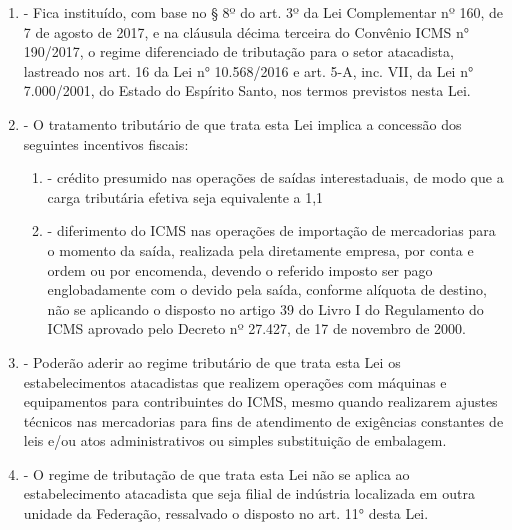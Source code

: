\documentclass[10pt]{article}
\begin{document}
\begin{enumerate}[label=Art. \arabic*\textdegree]

\item - Fica instituído, com base no § 8º do art. 3º da Lei Complementar nº 160, de 7 de agosto de 2017, e na cláusula décima terceira do Convênio ICMS n° 190/2017, o regime diferenciado de tributação para o setor atacadista, lastreado nos art. 16 da Lei n° 10.568/2016 e art. 5-A, inc. VII, da Lei n° 7.000/2001, do Estado do Espírito Santo, nos termos previstos nesta Lei.

\item - O tratamento tributário de que trata esta Lei implica a concessão dos seguintes incentivos fiscais:
\begin{enumerate}[label=\Roman*]
\item - crédito presumido nas operações de saídas interestaduais, de modo que a carga tributária efetiva seja equivalente a 1,1 %
\item - diferimento do ICMS nas operações de importação de mercadorias para o momento da saída, realizada pela diretamente empresa, por conta e ordem ou por encomenda, devendo o referido imposto ser pago englobadamente com o devido pela saída, conforme alíquota de destino, não se aplicando o disposto no artigo 39 do Livro I do Regulamento do ICMS aprovado pelo Decreto nº 27.427, de 17 de novembro de 2000.
\end{enumerate}

\item - Poderão aderir ao regime tributário de que trata esta Lei os estabelecimentos atacadistas que realizem operações com máquinas e equipamentos para contribuintes do ICMS, mesmo quando realizarem ajustes técnicos nas mercadorias para fins de atendimento de exigências constantes de leis e/ou atos administrativos ou simples substituição de embalagem.

\item - O regime de tributação de que trata esta Lei não se aplica ao estabelecimento atacadista que seja filial de indústria localizada em outra unidade da Federação, ressalvado o disposto no art. 11° desta Lei.


\end{enumerate}
\end{document}
